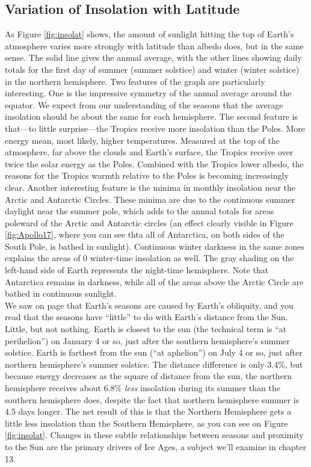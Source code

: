 \subsection{Variation of Insolation with Latitude}
As Figure \ref{fig:insolat} shows, the amount of sunlight hitting the top of Earth's atmosphere varies more strongly with latitude than albedo does, but in the same sense. The solid line gives the annual average, with the other lines showing daily totals for the first day of summer (summer solstice) and winter (winter solstice) in the northern hemisphere. Two features of the graph are particularly interesting. One is the impressive symmetry of the annual average around the equator. We expect from our understanding of the seasons that the average insolation should be about the same for each hemisphere. The second feature is that---to little surprise---the Tropics receive more insolation than the Poles. More energy mean, most likely, higher temperatures. Measured at the top of the atmosphere, far above the clouds and Earth's surface, the Tropics receive over twice the solar energy as the Poles. Combined with the Tropics lower albedo, the reasons for the Tropics warmth relative to the Poles is becoming increasingly clear. Another interesting feature is the minima in monthly insolation near the Arctic and Antarctic Circles. These minima are due to the continuous summer daylight near the summer pole, which adds to the annual totals for areas poleward of the Arctic and Antarctic circles (an effect clearly visible in Figure \ref{fig:Apollo17}, where you can see thta all of Antarctica, on both sides of the South Pole, is bathed in sunlight). Continuous winter darkness in the same zones explains the areas of 0 winter-time insolation as well. The gray shading on the left-hand side of Earth represents the night-time hemisphere. Note that Antarctica remains in darkness, while all of the areas above the Arctic Circle are bathed in continuous sunlight.\\ 
We saw on page \pageref{distance_cite} that Earth's seasons are caused by Earth's obliquity, and you read that the seasons have ``little'' to do with Earth's distance from the Sun. Little, but not nothing. Earth is closest to the sun (the technical term is ``at perihelion'') on January 4 or so, just after the southern hemisphere's summer solstice. Earth is farthest from the sun (``at aphelion'') on July 4 or so, just after northern hemisphere's summer solstice. The distance difference is only 3.4\%, but because energy decreases as the square of distance from the sun, the northern hemisphere receives about 6.8\% \emph{less} insolation during its summer than the southern hemisphere does, despite the fact that northern hemisphere summer is 4.5 days longer. The net result of this is that the Northern Hemisphere gets a little less insolation than the Southern Hemisphere, as you can see on Figure \ref{fig:insolat}. Changes in these subtle relationships between seasons and proximity to the Sun are the primary drivers of Ice Ages, a subject we'll examine in chapter 13.\\
  
